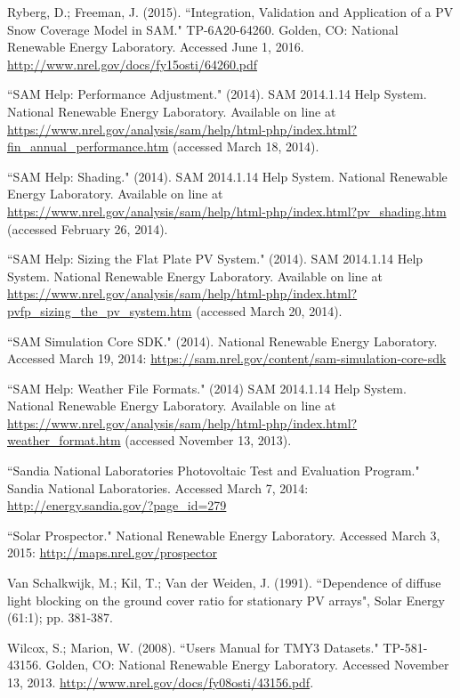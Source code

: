 \documentclass[12pt,letterpaper]{article}
\begin{document}
\begin{thebibliography}{99}
 Ryberg, D.; Freeman, J. (2015). ``Integration, Validation and Application of a PV Snow Coverage Model in SAM." TP-6A20-64260. Golden, CO: National Renewable Energy Laboratory. Accessed June 1, 2016. \url{http://www.nrel.gov/docs/fy15osti/64260.pdf}

 ``SAM Help: Performance Adjustment." (2014). SAM 2014.1.14 Help System. National Renewable Energy Laboratory. Available on line at \url{https://www.nrel.gov/analysis/sam/help/html-php/index.html?fin_annual_performance.htm} (accessed March 18, 2014).

 ``SAM Help: Shading." (2014). SAM 2014.1.14 Help System. National Renewable Energy Laboratory. Available on line at \url{https://www.nrel.gov/analysis/sam/help/html-php/index.html?pv_shading.htm} (accessed February 26, 2014).

 ``SAM Help: Sizing the Flat Plate PV System." (2014). SAM 2014.1.14 Help System. National Renewable Energy Laboratory. Available on line at \url{https://www.nrel.gov/analysis/sam/help/html-php/index.html?pvfp\_sizing\_the\_pv\_system.htm} (accessed March 20, 2014).

 ``SAM Simulation Core SDK." (2014). National Renewable Energy Laboratory. Accessed March 19, 2014: \url{https://sam.nrel.gov/content/sam-simulation-core-sdk}

 ``SAM Help: Weather File Formats." (2014) SAM 2014.1.14 Help System. National Renewable Energy Laboratory. Available on line at  \url{https://www.nrel.gov/analysis/sam/help/html-php/index.html?weather_format.htm} (accessed November 13, 2013).

 ``Sandia National Laboratories Photovoltaic Test and Evaluation Program." Sandia National Laboratories. Accessed March 7, 2014: \url{http://energy.sandia.gov/?page_id=279}

``Solar Prospector." National Renewable Energy Laboratory. Accessed March 3, 2015: \url{http://maps.nrel.gov/prospector}

 Van Schalkwijk, M.; Kil, T.; Van der Weiden, J. (1991). ``Dependence of diffuse light blocking on the ground cover ratio for stationary PV arrays", Solar Energy (61:1); pp. 381-387.

 Wilcox, S.; Marion, W. (2008). ``Users Manual for TMY3 Datasets." TP-581-43156. Golden, CO: National Renewable Energy Laboratory. Accessed November 13, 2013. \url{http://www.nrel.gov/docs/fy08osti/43156.pdf}.


\end{thebibliography}
\end{document}
